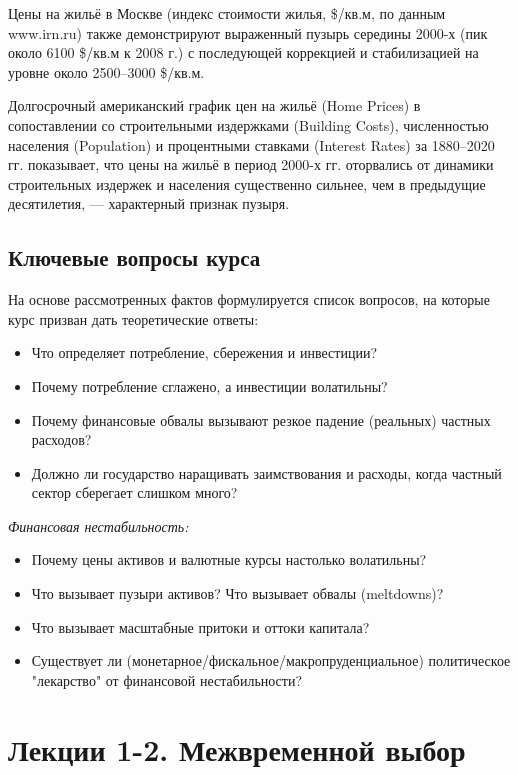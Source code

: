 \documentclass[10pt,a4paper]{article}
\begin{document}
Цены на жильё в Москве (индекс стоимости жилья, \$/кв.м, по данным www.irn.ru) также демонстрируют выраженный пузырь середины 2000-х (пик около 6100 \$/кв.м к 2008 г.) с последующей коррекцией и стабилизацией на уровне около 2500--3000 \$/кв.м.
 
Долгосрочный американский график цен на жильё (Home Prices) в сопоставлении со строительными издержками (Building Costs), численностью населения (Population) и процентными ставками (Interest Rates) за 1880--2020 гг. показывает, что цены на жильё в период 2000-х гг. оторвались от динамики строительных издержек и населения существенно сильнее, чем в предыдущие десятилетия, — характерный признак пузыря.
 
\subsection{Ключевые вопросы курса}
 
На основе рассмотренных фактов формулируется список вопросов, на которые курс призван дать теоретические ответы:
 
\begin{itemize}
\item Что определяет потребление, сбережения и инвестиции?
\item Почему потребление сглажено, а инвестиции волатильны?
\item Почему финансовые обвалы вызывают резкое падение (реальных) частных расходов?
\item Должно ли государство наращивать заимствования и расходы, когда частный сектор сберегает слишком много?
\end{itemize}
 
\textit{Финансовая нестабильность:}
\begin{itemize}
\item Почему цены активов и валютные курсы настолько волатильны?
\item Что вызывает пузыри активов? Что вызывает обвалы (meltdowns)?
\item Что вызывает масштабные притоки и оттоки капитала?
\item Существует ли (монетарное/фискальное/макропруденциальное) политическое "лекарство" от финансовой нестабильности?
\end{itemize}
 
\newpage
\section{Лекции 1-2. Межвременной выбор}
 
\end{document}
